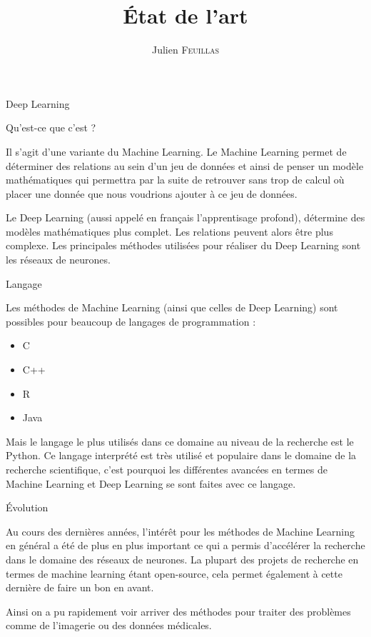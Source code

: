 \documentclass{book}
\title{\'Etat de l'art}
\author{Julien \textsc{Feuillas}}
\newcommand{\p}{\vspace{0.2cm}}
\begin{document}
  \pagedegarde

  \thispagestyle{empty}
	\pagestyle{plain}

	\cleardoublepage
	\renewcommand{\cleardoublepage}{\clearpage}

  \begin{chapter}{Deep Learning}

    \begin{section}{Qu'est-ce que c'est ?}

      Il s'agit d'une variante du Machine Learning. Le Machine Learning permet de déterminer des relations au sein d'un jeu de données et ainsi de penser un modèle mathématiques qui permettra par la suite de retrouver sans trop de calcul où placer une donnée que nous voudrions ajouter à ce jeu de données.\p

      Le Deep Learning (aussi appelé en français l'apprentisage profond), détermine des modèles mathématiques plus complet. Les relations peuvent alors être plus complexe. Les principales méthodes utilisées pour réaliser du Deep Learning sont les réseaux de neurones.\p

    \end{section}

    \begin{section}{Langage}

      Les méthodes de Machine Learning (ainsi que celles de Deep Learning) sont possibles pour beaucoup de langages de programmation :
      \begin{itemize}
        \item C
        \item C++
        \item R
        \item Java
      \end{itemize}\p

      Mais le langage le plus utilisés dans ce domaine au niveau de la recherche est le Python. Ce langage interprété est très utilisé et populaire dans le domaine de la recherche scientifique, c'est pourquoi les différentes avancées en termes de Machine Learning et Deep Learning se sont faites avec ce langage.\p

    \end{section}

    \begin{section}{\'Evolution}

      Au cours des dernières années, l'intérêt pour les méthodes de Machine Learning en général a été de plus en plus important ce qui a permis d'accélérer la recherche dans le domaine des réseaux de neurones. La plupart des projets de recherche en termes de machine learning étant open-source, cela permet également à cette dernière de faire un bon en avant.

      Ainsi on a pu rapidement voir arriver des méthodes pour traiter des problèmes comme de l'imagerie ou des données médicales.\p

    \end{section}

  \end{chapter}
\end{document}
